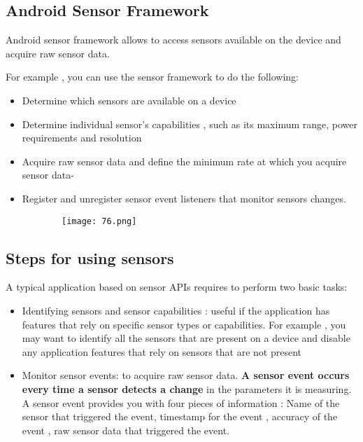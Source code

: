 \documentclass{article}
\begin{document}
\subsection{Android Sensor Framework}

Android sensor framework allows  to access sensors available on the device and acquire raw sensor data.

For example , you can use the sensor framework to do the following:

\begin{itemize}
    \item Determine which sensors are available on a device
    \item Determine individual sensor's capabilities , such as its maximum range, power requirements and resolution
    \item Acquire raw sensor data and define the minimum rate at which you acquire sensor data-
    \item Register and unregister sensor event listeners that monitor sensors changes.
\end{itemize}

    \begin{figure}[ht!]
  \centering
  \begin{subfigure}[b]{1\linewidth}
  \texttt{[image: 76.png]}
  \end{subfigure}
  \end{figure}

  \subsection{Steps for using sensors}

  A typical application based on sensor APIs requires to perform two basic tasks:

  \begin{itemize}
      \item Identifying sensors and sensor capabilities : useful if the application has features that rely on specific sensor types or capabilities. For example , you may want to identify all the sensors that are present on a device and disable any application features that rely on sensors that are not present

      \item Monitor sensor events: to acquire raw sensor data. \textbf{A sensor event occurs every time a sensor detects a change} in the parameters it is measuring. A sensor event provides you with four pieces of information : Name of the sensor that triggered the event, timestamp for the event , accuracy of the event , raw sensor data that triggered the event.
  \end{itemize}
\end{document}
